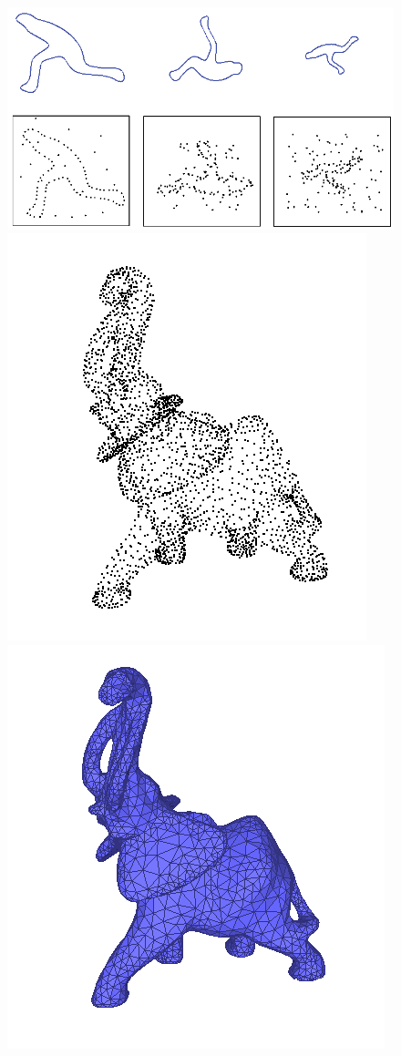 \documentclass{beamer}
\begin{document}
\begin{frame}[allowframebreaks]
    \begin{figure}
        \centering
        \includegraphics[scale=0.25]{img/noise-2d}
        \includegraphics[scale=0.2]{img/elephant-point-cloud}
        \includegraphics[scale=0.2]{img/elephant-mesh}
    \end{figure}


\end{frame}
\end{document}
